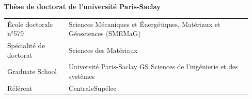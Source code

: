 {{\begin{titlepage}
        
        \flushright
        \vspace{20mm} %
        \color{Prune}
        \selectfont
        \huge {\thesistitre} \\
        
        \normalsize
        \color{black}
        \Large {{\textit{\thesistitle}}} \\
        
        \fontsize{8}{12}\selectfont
        
        \vspace{1.5cm}
        
        \normalsize
        \textbf{Thèse de doctorat de l'université Paris-Saclay}%
        
        \vspace{6mm}
        \small
        \begin{tabular}{>{\raggedleft\arraybackslash}p{5cm}>{\raggedright\arraybackslash}p{7cm}}
            \'Ecole doctorale n°579 &Sciences Mécaniques et \'Energétiques, Matériaux et Géosciences (SMEMaG) \\
            Spécialité de doctorat & Sciences des Matériaux\\
            Graduate School & Université Paris-Saclay GS Sciences de l’ingénierie et des systèmes\\
            Référent & CentraleSupélec
        \end{tabular} 
        \vspace{6mm}
        

\end{titlepage}}}

